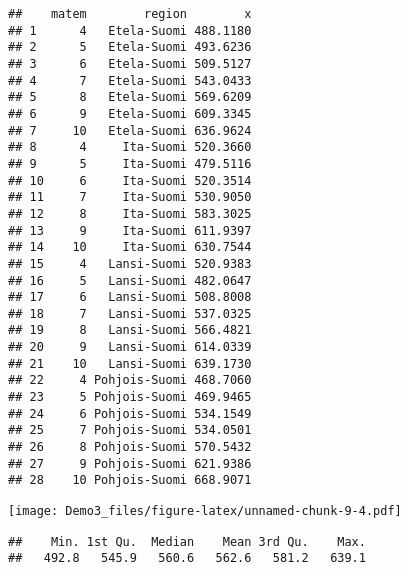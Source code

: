 \documentclass[
]{article}
\newenvironment{Shaded}{\begin{snugshade}}{\end{snugshade}}
\newcommand{\AttributeTok}[1]{\textcolor[rgb]{0.13,0.29,0.53}{#1}}
\newcommand{\FunctionTok}[1]{\textcolor[rgb]{0.13,0.29,0.53}{\textbf{#1}}}
\newcommand{\NormalTok}[1]{#1}
\newcommand{\SpecialCharTok}[1]{\textcolor[rgb]{0.81,0.36,0.00}{\textbf{#1}}}
\newcommand{\StringTok}[1]{\textcolor[rgb]{0.31,0.60,0.02}{#1}}
\begin{document}
\begin{verbatim}
##    matem        region        x
## 1      4   Etela-Suomi 488.1180
## 2      5   Etela-Suomi 493.6236
## 3      6   Etela-Suomi 509.5127
## 4      7   Etela-Suomi 543.0433
## 5      8   Etela-Suomi 569.6209
## 6      9   Etela-Suomi 609.3345
## 7     10   Etela-Suomi 636.9624
## 8      4     Ita-Suomi 520.3660
## 9      5     Ita-Suomi 479.5116
## 10     6     Ita-Suomi 520.3514
## 11     7     Ita-Suomi 530.9050
## 12     8     Ita-Suomi 583.3025
## 13     9     Ita-Suomi 611.9397
## 14    10     Ita-Suomi 630.7544
## 15     4   Lansi-Suomi 520.9383
## 16     5   Lansi-Suomi 482.0647
## 17     6   Lansi-Suomi 508.8008
## 18     7   Lansi-Suomi 537.0325
## 19     8   Lansi-Suomi 566.4821
## 20     9   Lansi-Suomi 614.0339
## 21    10   Lansi-Suomi 639.1730
## 22     4 Pohjois-Suomi 468.7060
## 23     5 Pohjois-Suomi 469.9465
## 24     6 Pohjois-Suomi 534.1549
## 25     7 Pohjois-Suomi 534.0501
## 26     8 Pohjois-Suomi 570.5432
## 27     9 Pohjois-Suomi 621.9386
## 28    10 Pohjois-Suomi 668.9071
\end{verbatim}

\begin{Shaded}
\end{Shaded}

\texttt{[image: Demo3\_files/figure-latex/unnamed-chunk-9-4.pdf]}

\begin{Shaded}
\end{Shaded}

\begin{verbatim}
##    Min. 1st Qu.  Median    Mean 3rd Qu.    Max. 
##   492.8   545.9   560.6   562.6   581.2   639.1
\end{verbatim}

\begin{Shaded}
\end{Shaded}
\end{document}
